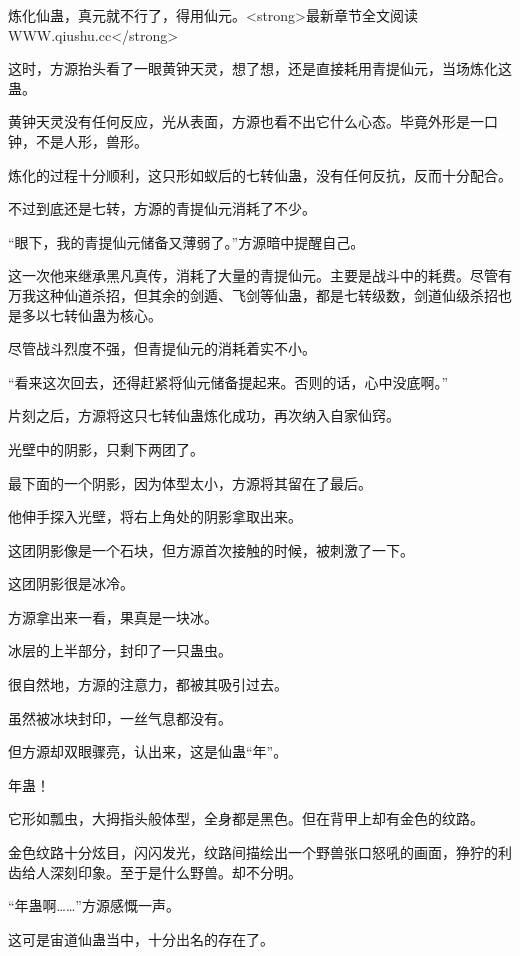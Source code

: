 
\begin{this_body}

炼化仙蛊，真元就不行了，得用仙元。<strong>最新章节全文阅读WWW.qiushu.cc</strong>

这时，方源抬头看了一眼黄钟天灵，想了想，还是直接耗用青提仙元，当场炼化这蛊。

黄钟天灵没有任何反应，光从表面，方源也看不出它什么心态。毕竟外形是一口钟，不是人形，兽形。

炼化的过程十分顺利，这只形如蚁后的七转仙蛊，没有任何反抗，反而十分配合。

不过到底还是七转，方源的青提仙元消耗了不少。

“眼下，我的青提仙元储备又薄弱了。”方源暗中提醒自己。

这一次他来继承黑凡真传，消耗了大量的青提仙元。主要是战斗中的耗费。尽管有万我这种仙道杀招，但其余的剑遁、飞剑等仙蛊，都是七转级数，剑道仙级杀招也是多以七转仙蛊为核心。

尽管战斗烈度不强，但青提仙元的消耗着实不小。

“看来这次回去，还得赶紧将仙元储备提起来。否则的话，心中没底啊。”

片刻之后，方源将这只七转仙蛊炼化成功，再次纳入自家仙窍。

光壁中的阴影，只剩下两团了。

最下面的一个阴影，因为体型太小，方源将其留在了最后。

他伸手探入光壁，将右上角处的阴影拿取出来。

这团阴影像是一个石块，但方源首次接触的时候，被刺激了一下。

这团阴影很是冰冷。

方源拿出来一看，果真是一块冰。

冰层的上半部分，封印了一只蛊虫。

很自然地，方源的注意力，都被其吸引过去。

虽然被冰块封印，一丝气息都没有。

但方源却双眼骤亮，认出来，这是仙蛊“年”。

年蛊！

它形如瓢虫，大拇指头般体型，全身都是黑色。但在背甲上却有金色的纹路。

金色纹路十分炫目，闪闪发光，纹路间描绘出一个野兽张口怒吼的画面，狰狞的利齿给人深刻印象。至于是什么野兽。却不分明。

“年蛊啊……”方源感慨一声。

这可是宙道仙蛊当中，十分出名的存在了。


\end{this_body}
